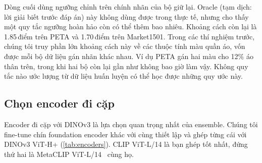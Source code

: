 \documentclass[10pt,twocolumn,letterpaper]{article}
\newcommand{\pts}{\,điểm}
\begin{document}
Dòng cuối dùng ngưỡng chỉnh trên chính nhãn của bộ giữ lại. Oracle (tạm dịch: lời giải biết trước đáp án) này không dùng được trong thực tế, nhưng cho thấy một quy tắc ngưỡng hoàn hảo còn có thể thêm bao nhiêu. Khoảng cách còn lại là 1.85\pts{} trên PETA và 1.70\pts{} trên Market1501. Trong các thí nghiệm trước, chúng tôi truy phần lớn khoảng cách này về các thuộc tính màu quần áo, vốn được mỗi bộ dữ liệu gán nhãn khác nhau. Ví dụ PETA gán hai màu cho 12\% áo thân trên, trong khi hai bộ còn lại gần như không bao giờ làm vậy. Không quy tắc nào ước lượng từ dữ liệu huấn luyện có thể học được những quy ước này.

\begin{table}[t]
\centering\small
\setlength{\tabcolsep}{3pt}
\caption{Xây hệ thống từng bước. AUC không phụ thuộc ngưỡng nên chỉ ghi một lần cho mỗi mô hình.}
\label{tab:main}
\end{table}

\subsection{Chọn encoder đi cặp}
\label{sec:exp_partner}

Encoder đi cặp với DINOv3 là lựa chọn quan trọng nhất của ensemble. Chúng tôi fine-tune chín foundation encoder khác với cùng thiết lập và ghép từng cái với DINOv3 ViT-H+ (\cref{tab:encoders}). CLIP ViT-L/14 là bạn ghép tốt nhất, đứng thứ hai là MetaCLIP ViT-L/14~\cite{metaclip} cùng họ.
\end{document}

